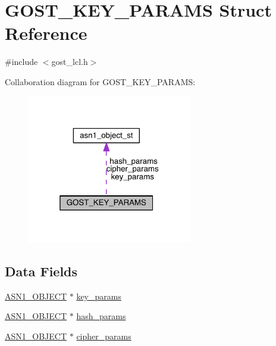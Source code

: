 \hypertarget{struct_g_o_s_t___k_e_y___p_a_r_a_m_s}{}\section{G\+O\+S\+T\+\_\+\+K\+E\+Y\+\_\+\+P\+A\+R\+A\+MS Struct Reference}
\label{struct_g_o_s_t___k_e_y___p_a_r_a_m_s}


{\ttfamily \#include $<$gost\+\_\+lcl.\+h$>$}



Collaboration diagram for G\+O\+S\+T\+\_\+\+K\+E\+Y\+\_\+\+P\+A\+R\+A\+MS\+:\nopagebreak
\begin{figure}[H]
\begin{center}
\leavevmode
\includegraphics[width=205pt]{struct_g_o_s_t___k_e_y___p_a_r_a_m_s__coll__graph}
\end{center}
\end{figure}
\subsection*{Data Fields}
\begin{DoxyCompactItemize}
\item 
\hyperlink{crypto_2ossl__typ_8h_ae3fda0801e4c8e250087052bafb3ce2e}{A\+S\+N1\+\_\+\+O\+B\+J\+E\+CT} $\ast$ \hyperlink{struct_g_o_s_t___k_e_y___p_a_r_a_m_s_af17ddf42a076d94b413ac7476c7f7832}{key\+\_\+params}
\item 
\hyperlink{crypto_2ossl__typ_8h_ae3fda0801e4c8e250087052bafb3ce2e}{A\+S\+N1\+\_\+\+O\+B\+J\+E\+CT} $\ast$ \hyperlink{struct_g_o_s_t___k_e_y___p_a_r_a_m_s_a783dfac2486746159d51618b37f4af2f}{hash\+\_\+params}
\item 
\hyperlink{crypto_2ossl__typ_8h_ae3fda0801e4c8e250087052bafb3ce2e}{A\+S\+N1\+\_\+\+O\+B\+J\+E\+CT} $\ast$ \hyperlink{struct_g_o_s_t___k_e_y___p_a_r_a_m_s_a8c35d15992e4e774f5c319ed0725b440}{cipher\+\_\+params}
\end{DoxyCompactItemize}


